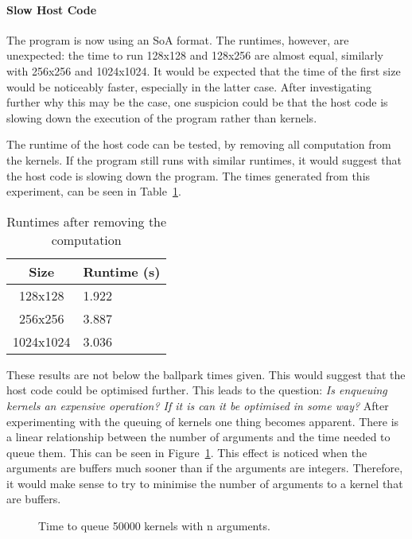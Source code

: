 

\paragraph{Slow Host Code}
The program is now using an SoA format. The runtimes, however, are unexpected: the time to run 128x128 and 128x256 are almost equal, similarly with 256x256 and 1024x1024. It would be expected that the time of the first size would be noticeably faster, especially in the latter case. After investigating further why this may be the case, one suspicion could be that the host code is slowing down the execution of the program rather than kernels. 

The runtime of the host code can be tested, by removing all computation from the kernels. If the program still runs with similar runtimes, it would suggest that the host code is slowing down the program. The times generated from this experiment, can be seen in Table~\ref{table:commented-kernels}. 


\begin{table}[ht]
\vspace{-5mm}
\centering
\caption{Runtimes after removing the computation}
\vspace{1mm}
\begin{tabular}{|c||p{5.8em}|}
    \hline
    Size & Runtime (s) \\
    \hline
    128x128 & 1.922 \\
    \hline
    256x256 & 3.887 \\
    \hline
    1024x1024 & 3.036 \\
    \hline
\end{tabular}
\label{table:commented-kernels}
\vspace{-3mm}
\end{table}

These results are not below the ballpark times given. This would suggest that the host code could be optimised further. This leads to the question: \textit{Is enqueuing kernels an expensive operation? If it is can it be optimised in some way?} After experimenting with the queuing of kernels one thing becomes apparent. There is a linear relationship between the number of arguments and the time needed to queue them. This can be seen in Figure~\ref{graph:slow-host-kernel-args-scaling}. This effect is noticed when the arguments are buffers much sooner than if the arguments are integers. Therefore, it would make sense to try to minimise the number of arguments to a kernel that are buffers.



\begin{figure}[ht]

\vspace{-3mm}
\caption{Time to queue 50000 kernels with n arguments.}
\label{graph:slow-host-kernel-args-scaling}
\vspace{-3mm}
\end{figure}

